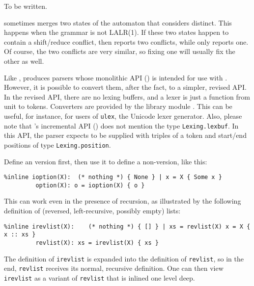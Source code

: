 \documentclass[onecolumn,11pt,nocopyrightspace,preprint]{sigplanconf}
\begin{document}

To be written. %

 \ocamlyacc sometimes merges two states
of the automaton that \menhir considers distinct. This happens
when the grammar is not LALR(1). If these two states happen to
contain a shift/reduce conflict, then \menhir reports two conflicts,
while \ocamlyacc only reports one. Of course, the two conflicts are
very similar, so fixing one will usually fix the other as well.

 Like \ocamlyacc, \menhir produces parsers whose monolithic API
() is intended for use with \ocamllex. However, it is
possible to convert them, after the fact, to a simpler, revised API. In the
revised API, there are no lexing buffers, and a lexer is just a function from
unit to tokens. Converters are provided by the library module
\menhirlibconvert. This can be useful, for instance, for users of
\texttt{ulex}, the Unicode lexer generator. Also, please note that \menhir's
incremental API () does not mention the type
\verb+Lexing.lexbuf+. In this API, the parser expects to be supplied with
triples of a token and start/end positions of type \verb+Lexing.position+.

 Define an \dinline version first, then use it to
define a non-\dinline version, like this:
\begin{verbatim}
%inline ioption(X):  (* nothing *) { None } | x = X { Some x }
         option(X): o = ioption(X) { o }
\end{verbatim}
This can work even in the presence of recursion, as illustrated by the
following definition of (reversed, left-recursive, possibly empty) lists:
\begin{verbatim}
%inline irevlist(X):    (* nothing *) { [] } | xs = revlist(X) x = X { x :: xs }
         revlist(X): xs = irevlist(X) { xs }
\end{verbatim}
The definition of \verb+irevlist+ is expanded into the definition of \verb+revlist+,
so in the end, \verb+revlist+ receives its normal, recursive definition. One can
then view \verb+irevlist+ as a variant of \verb+revlist+ that is inlined one level
deep.
\end{document}
